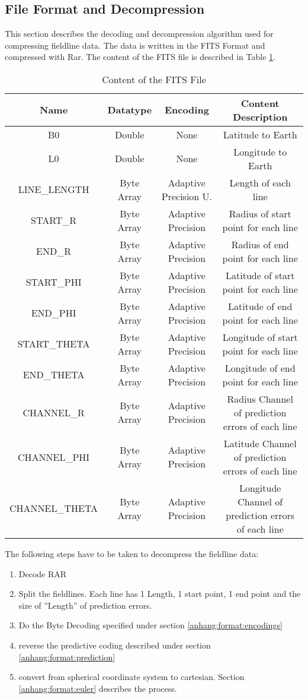 \subsection*{File Format and Decompression}
This section describes the decoding and decompression algorithm used for compressing fieldline data. The data is written in the FITS Format \cite{website:fits} and compressed with Rar. The content of the FITS file is described in Table \ref{anhang:format:content}.\\
\begin{table}[!htbp]
\center
\begin{tabular}{|c|c|c|c|}
	\hline
	Name  & Datatype & Encoding& Content Description	\\\hline
    B0 & Double & None & Latitude to Earth\\
    L0 & Double& None& Longitude to Earth\\
    LINE\_LENGTH &Byte Array & Adaptive Precision U. & Length of each line\\
    START\_R & Byte Array & Adaptive Precision & Radius of start point for each line\\
    END\_R & Byte Array & Adaptive Precision & Radius of end point for each line\\
    START\_PHI & Byte Array & Adaptive Precision & Latitude of start point for each line\\
    END\_PHI & Byte Array & Adaptive Precision & Latitude of end point for each line\\
    START\_THETA & Byte Array & Adaptive Precision & Longitude of start point for each line\\
    END\_THETA & Byte Array & Adaptive Precision & Longitude of end point for each line\\
    CHANNEL\_R & Byte Array & Adaptive Precision & Radius Channel of prediction errors of each line\\
    CHANNEL\_PHI & Byte Array & Adaptive Precision & Latitude Channel of prediction errors of each line\\
    CHANNEL\_THETA & Byte Array & Adaptive Precision & Longitude Channel of prediction errors of each line\\\hline
\end{tabular}
\caption{Content of the FITS File}
\label{anhang:format:content}
\end{table}
The following steps have to be taken to decompress the fieldline data:
\begin{enumerate}
	\item Decode RAR
	\item Split the fieldlines. Each line has 1 Length, 1 start point, 1 end point and the size of ''Length'' of prediction errors.
	\item Do the Byte Decoding specified under section \ref{anhang:format:encodings}
	\item reverse the predictive coding described under section \ref{anhang:format:prediction}
	\item convert from spherical coordinate system to cartesian. Section \ref{anhang:format:euler} describes the process.
\end{enumerate}

